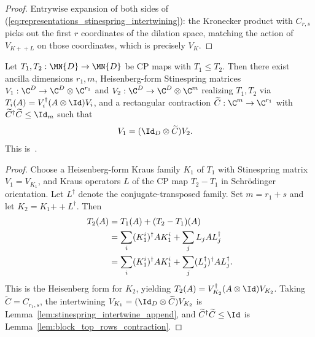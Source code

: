 \begin{proof}\leanok
    Entrywise expansion of both sides of
    (\ref{eq:representations_stinespring_intertwining}): the Kronecker product
    with $C_{r,s}$ picks out the first $r$ coordinates of the dilation space,
    matching the action of $V_{K+\!+L}$ on those coordinates, which is
    precisely $V_K$.
\end{proof}

\begin{theorem}\label{thm:cp_dominates_stinespring_contraction}
    \leanok
    Let $T_1,T_2:\MN{D}\to\MN{D}$ be CP maps with $T_1\le T_2$.
    Then there exist ancilla dimensions $r_1,m$, Heisenberg-form Stinespring
    matrices $V_1:\C^D\to\C^D\otimes\C^{r_1}$ and
    $V_2:\C^D\to\C^D\otimes\C^m$ realizing $T_1,T_2$ via
    $T_i(A)=V_i^\dagger(A\otimes\Id)V_i$, and a rectangular contraction
    $\widetilde C:\C^m\to\C^{r_1}$ with
    $\widetilde C^\dagger\widetilde C\le\Id_m$ such that
    \begin{align}
        V_1
        &=(\Id_D\otimes\widetilde C)V_2.
        \label{eq:representations_ordered_intertwining}
    \end{align}
    This is~\cite[Theorem~2.3]{Wolf2012Quantum}.
\end{theorem}

\begin{proof}\leanok
    Choose a Heisenberg-form Kraus family $K_1$ of $T_1$ with Stinespring
    matrix $V_1=V_{K_1}$, and Kraus operators $L$ of the CP map
    $T_2-T_1$ in Schr\"odinger orientation. Let $L^\dagger$ denote the
    conjugate-transposed family. Set $m=r_1+s$ and let
    $K_2=K_1\mathbin{+\!+}L^\dagger$. Then
    \begin{align}
        T_2(A)
        &=T_1(A)+(T_2-T_1)(A) \notag\\
        &=\sum_i(K_1^i)^\dagger A K_1^i+\sum_jL_j A L_j^\dagger \notag\\
        &=\sum_i(K_1^i)^\dagger A K_1^i
          +\sum_j(L_j^\dagger)^\dagger A L_j^\dagger.
        \notag
    \end{align}
    This is the Heisenberg form for $K_2$, yielding
    $T_2(A)=V_{K_2}^\dagger(A\otimes\Id)V_{K_2}$. Taking
    $\widetilde C=C_{r_1,s}$, the intertwining
    $V_{K_1}=(\Id_D\otimes\widetilde C)V_{K_2}$ is
    Lemma~\ref{lem:stinespring_intertwine_append}, and
    $\widetilde C^\dagger\widetilde C\le\Id$ is
    Lemma~\ref{lem:block_top_rows_contraction}.
\end{proof}

